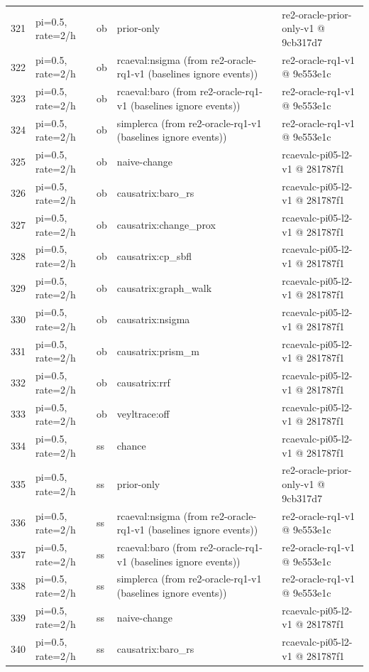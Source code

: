 \begin{longtable}{@{}r>{\raggedright\arraybackslash}p{48.0pt}>{\raggedright\arraybackslash}p{18.0pt}>{\raggedright\arraybackslash}p{108.0pt}>{\raggedright\arraybackslash}p{105.0pt}@{}}
321 & pi=0.5, rate=2/h & ob & prior-only & re2-oracle-prior-only-v1 @ 9cb317d7 \\
322 & pi=0.5, rate=2/h & ob & rcaeval:nsigma (from re2-oracle-rq1-v1 (baselines ignore events)) & re2-oracle-rq1-v1 @ 9e553e1c \\
323 & pi=0.5, rate=2/h & ob & rcaeval:baro (from re2-oracle-rq1-v1 (baselines ignore events)) & re2-oracle-rq1-v1 @ 9e553e1c \\
324 & pi=0.5, rate=2/h & ob & simplerca (from re2-oracle-rq1-v1 (baselines ignore events)) & re2-oracle-rq1-v1 @ 9e553e1c \\
325 & pi=0.5, rate=2/h & ob & naive-change & rcaevalc-pi05-l2-v1 @ 281787f1 \\
326 & pi=0.5, rate=2/h & ob & causatrix:baro\_rs & rcaevalc-pi05-l2-v1 @ 281787f1 \\
327 & pi=0.5, rate=2/h & ob & causatrix:change\_prox & rcaevalc-pi05-l2-v1 @ 281787f1 \\
328 & pi=0.5, rate=2/h & ob & causatrix:cp\_sbfl & rcaevalc-pi05-l2-v1 @ 281787f1 \\
329 & pi=0.5, rate=2/h & ob & causatrix:graph\_walk & rcaevalc-pi05-l2-v1 @ 281787f1 \\
330 & pi=0.5, rate=2/h & ob & causatrix:nsigma & rcaevalc-pi05-l2-v1 @ 281787f1 \\
331 & pi=0.5, rate=2/h & ob & causatrix:prism\_m & rcaevalc-pi05-l2-v1 @ 281787f1 \\
332 & pi=0.5, rate=2/h & ob & causatrix:rrf & rcaevalc-pi05-l2-v1 @ 281787f1 \\
333 & pi=0.5, rate=2/h & ob & veyltrace:off & rcaevalc-pi05-l2-v1 @ 281787f1 \\
334 & pi=0.5, rate=2/h & ss & chance & rcaevalc-pi05-l2-v1 @ 281787f1 \\
335 & pi=0.5, rate=2/h & ss & prior-only & re2-oracle-prior-only-v1 @ 9cb317d7 \\
336 & pi=0.5, rate=2/h & ss & rcaeval:nsigma (from re2-oracle-rq1-v1 (baselines ignore events)) & re2-oracle-rq1-v1 @ 9e553e1c \\
337 & pi=0.5, rate=2/h & ss & rcaeval:baro (from re2-oracle-rq1-v1 (baselines ignore events)) & re2-oracle-rq1-v1 @ 9e553e1c \\
338 & pi=0.5, rate=2/h & ss & simplerca (from re2-oracle-rq1-v1 (baselines ignore events)) & re2-oracle-rq1-v1 @ 9e553e1c \\
339 & pi=0.5, rate=2/h & ss & naive-change & rcaevalc-pi05-l2-v1 @ 281787f1 \\
340 & pi=0.5, rate=2/h & ss & causatrix:baro\_rs & rcaevalc-pi05-l2-v1 @ 281787f1 \\

\end{longtable}
